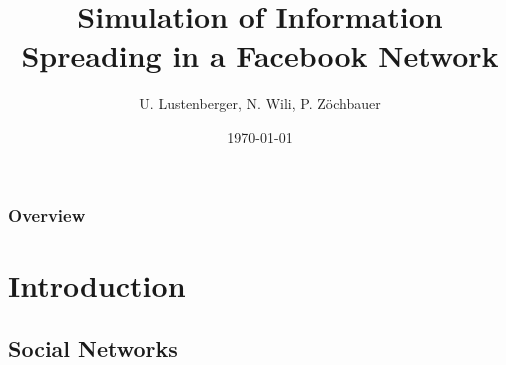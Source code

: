 \documentclass{beamer}
\title[Infospreading]{Simulation of Information Spreading in a Facebook Network} %
\author{U. Lustenberger, N. Wili, P. Z\"ochbauer} %
\institute[ETHZ] %
{
Federal Institute of Technology Zurich \\ %
\medskip
\textit{} %
}
\date{\today} %
\begin{document}
\begin{frame}
\titlepage %
\end{frame}

\begin{frame}
\frametitle{Overview} %
\tableofcontents %
\end{frame}


\section{Introduction} %

\subsection{Social Networks} %
\end{document}
